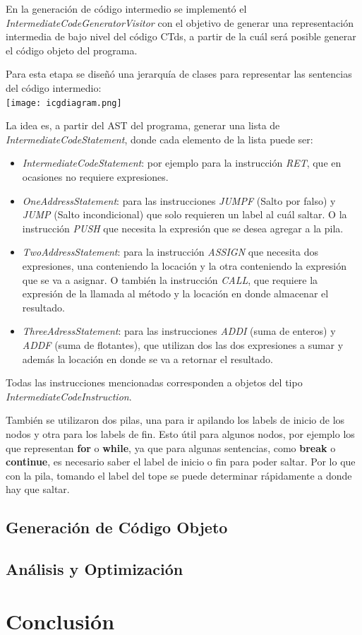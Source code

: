 \documentclass[11pt,a4paper]{article}
\begin{document}
En la generación de código intermedio se implementó el \textit{IntermediateCodeGeneratorVisitor} con el objetivo de generar una representación intermedia de bajo nivel del código CTds, a partir de la cuál será posible generar el código objeto del programa. 

Para esta etapa se diseñó una jerarquía de clases para representar las sentencias del código intermedio:
\\

\texttt{[image: icgdiagram.png]}

La idea es, a partir del AST del programa, generar una lista de  \textit{IntermediateCodeStatement}, donde cada elemento de la lista puede ser:
\begin{itemize}
\item \textit{IntermediateCodeStatement}: por ejemplo para la instrucción \textit{RET}, que en ocasiones no requiere expresiones.
\item \textit{OneAddressStatement}: para las instrucciones \textit{JUMPF} (Salto por falso) y \textit{JUMP} (Salto incondicional) que solo requieren un label al cuál saltar. O la instrucción \textit{PUSH} que necesita la expresión que se desea agregar a la pila. 
\item \textit{TwoAddressStatement}: para la instrucción \textit{ASSIGN} que necesita dos expresiones, una conteniendo la locación y la otra conteniendo la expresión que se va a asignar. O también la instrucción \textit{CALL}, que requiere la expresión de la llamada al método y la locación en donde almacenar el resultado.
\item \textit{ThreeAdressStatement}: para las instrucciones \textit{ADDI} (suma de enteros) y \textit{ADDF} (suma de flotantes), que utilizan dos las dos expresiones a sumar y además la locación en donde se va a retornar el resultado.
\end{itemize}

Todas las instrucciones mencionadas corresponden a objetos del tipo \textit{IntermediateCodeInstruction}.

También se utilizaron dos pilas, una para ir apilando los labels de inicio de los nodos y otra para los labels de fin. Esto útil para algunos nodos, por ejemplo los que representan \textbf{for} o \textbf{while}, ya que para algunas sentencias, como \textbf{break} o \textbf{continue}, es necesario saber el label de inicio o fin para poder saltar. Por lo que con la pila, tomando el label del tope se puede determinar rápidamente a donde hay que saltar. 

\subsection{Generación de Código Objeto} 
\label{subsec:genco}

\subsection{Análisis y Optimización} 
\label{subsec:opt}

\section{Conclusión} 
\label{sec:concl}
\end{document}
